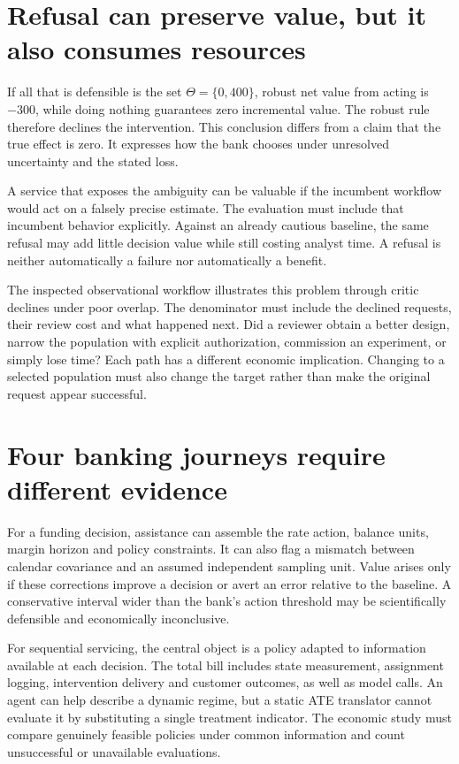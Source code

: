 \section{Refusal can preserve value, but it also consumes resources}

If all that is defensible is the set $\Theta=\{0,400\}$, robust net value from
acting is $-300$, while doing nothing guarantees zero incremental value.
The robust rule therefore declines the intervention. This conclusion differs
from a claim that the true effect is zero. It expresses how the bank chooses
under unresolved uncertainty and the stated loss.

A service that exposes the ambiguity can be valuable if the incumbent workflow
would act on a falsely precise estimate. The evaluation must include that
incumbent behavior explicitly. Against an already cautious baseline, the same
refusal may add little decision value while still costing analyst time. A
refusal is neither automatically a failure nor automatically a benefit.

The inspected observational workflow illustrates this problem through critic
declines under poor overlap.\cite{v12_la_2607_22443} The denominator must include
the declined requests, their review cost and what happened next. Did a reviewer
obtain a better design, narrow the population with explicit authorization,
commission an experiment, or simply lose time? Each path has a different
economic implication. Changing to a selected population must also change the
target rather than make the original request appear successful.

\section{Four banking journeys require different evidence}

For a funding decision, assistance can assemble the rate action, balance units,
margin horizon and policy constraints. It can also flag a mismatch between
calendar covariance and an assumed independent sampling unit. Value arises
only if these corrections improve a decision or avert an error relative to the
baseline. A conservative interval wider than the bank's action threshold may
be scientifically defensible and economically inconclusive.

For sequential servicing, the central object is a policy adapted to information
available at each decision. The total bill includes state measurement,
assignment logging, intervention delivery and customer outcomes, as well as
model calls. An agent can help describe a dynamic regime, but a static ATE
translator cannot evaluate it by substituting a single treatment indicator.
The economic study must compare genuinely feasible policies under common
information and count unsuccessful or unavailable evaluations.

